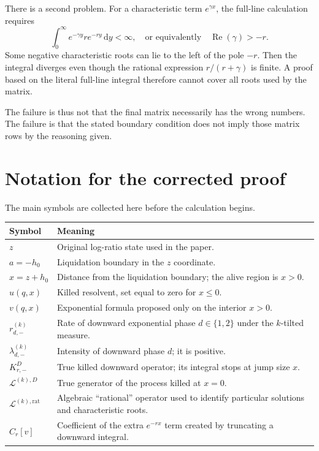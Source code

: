 \documentclass[11pt]{article}
\newcommand{\diff}{\mathrm{d}}
\newcommand{\cL}{\mathcal{L}}
\newcommand{\Rea}{\operatorname{Re}}
\theoremstyle{plain}
\theoremstyle{remark}
\begin{document}
There is a second problem.  For a characteristic term $e^{\gamma x}$, the
full-line calculation requires
\[
\int_0^\infty e^{-\gamma y}r e^{-ry}\,\diff y<\infty,
\quad\text{or equivalently}\quad \Rea(\gamma)>-r.
\]
Some negative characteristic roots can lie to the left of the pole $-r$.
Then the integral diverges even though the rational expression
$r/(r+\gamma)$ is finite.  A proof based on the literal full-line integral
therefore cannot cover all roots used by the matrix.

The failure is thus not that the final matrix necessarily has the wrong
numbers.  The failure is that the stated boundary condition does not imply
those matrix rows by the reasoning given.

\section{Notation for the corrected proof}

The main symbols are collected here before the calculation begins.
\begin{center}
\centering
\renewcommand{\arraystretch}{1.25}
\begin{tabularx}{\linewidth}{lX}
\toprule
Symbol & Meaning \\
\midrule
$z$ & Original log-ratio state used in the paper. \\
$a=-h_0$ & Liquidation boundary in the $z$ coordinate. \\
$x=z+h_0$ & Distance from the liquidation boundary; the alive region is $x>0$. \\
$u(q,x)$ & Killed resolvent, set equal to zero for $x\leq0$. \\
$v(q,x)$ & Exponential formula proposed only on the interior $x>0$. \\
$r_{d,-}^{(k)}$ & Rate of downward exponential phase $d\in\{1,2\}$ under the $k$-tilted measure. \\
$\lambda_{d,-}^{(k)}$ & Intensity of downward phase $d$; it is positive. \\
$K_{r,-}^{D}$ & True killed downward operator; its integral stops at jump size $x$. \\
$\cL^{(k),D}$ & True generator of the process killed at $x=0$. \\
$\cL^{(k),\mathrm{rat}}$ & Algebraic ``rational'' operator used to identify particular solutions and characteristic roots. \\
$C_r[v]$ & Coefficient of the extra $e^{-rx}$ term created by truncating a downward integral. \\
\bottomrule
\end{tabularx}
\end{center}
\end{document}
